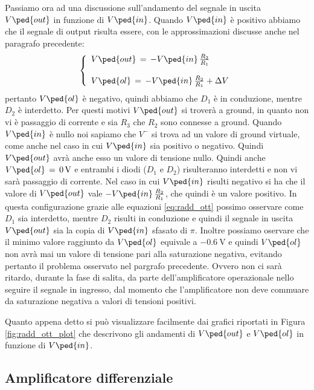 Passiamo ora ad una discussione sull'andamento del segnale in uscita $V\ped{out}$ in funzione di $V\ped{in}$. Quando $V\ped{in}$ è positivo abbiamo che il segnale di output risulta essere, con le approssimazioni discusse anche nel paragrafo precedente:
\begin{equation}
        \left\{
                \begin{array}{l l l}
                        V\ped{out}\,=\,-V\ped{in}\,\frac{R_2}{R_1}\\
                        \\
                        V\ped{ol}\,=\,-V\ped{in}\,\frac{R_2}{R_1} + \Delta V
                \end{array}
         \right.
         \label{eq:radd_ott}
\end{equation}
pertanto $V\ped{ol}$ è negativo, quindi abbiamo che $D_1$ è in conduzione, mentre $D_2$ è interdetto. Per questi motivi $V\ped{out}$ si troverà a ground, in quanto non vi è passaggio di corrente e sia $R_3$ che $R_2$ sono connesse a ground.
Quando $V\ped{in}$ è nullo noi sapiamo che $V^-$ si trova ad un valore di ground virtuale, come anche nel caso in cui $V\ped{in}$ sia positivo o negativo. Quindi $V\ped{out}$ avrà anche esso un valore di tensione nullo. Quindi anche $V\ped{ol}\,=\,\SI{0}{\volt}$ e entrambi i diodi ($D_1$ e $D_2$) risulteranno interdetti e non vi sarà passaggio di corrente.
Nel caso in cui $V\ped{in}$ risulti negativo si ha che il valore di $V\ped{out}$ vale $-V\ped{in}\,\frac{R_2}{R_1}$, che quindi è un valore positivo. In questa configurazione grazie alle equazioni \ref{eq:radd_ott} possimo osservare come $D_1$ sia interdetto, mentre $D_2$ risulti in conduzione e quindi il segnale in uscita $V\ped{out}$ sia la copia di $V\ped{in}$ sfasato di $\pi$. Inoltre possiamo oservare che il minimo valore raggiunto da $V\ped{ol}$ equivale a $\SI{-0.6}{\volt}$ e quindi $V\ped{ol}$ non avrà mai un valore di tensione pari alla saturazione negativa, evitando pertanto il problema osservato nel pargrafo precedente. Ovvero non ci sarà ritardo, durante la fase di salita, da parte dell'amplificatore operazionale nello seguire il segnale in ingresso, dal momento che l'amplificatore non deve commuare da saturazione negativa a valori di tensioni positivi.

Quanto appena detto si può visualizzare facilmente dai grafici riportati in Figura \ref{fig:radd_ott_plot} che descrivono gli andamenti di $V\ped{out}$ e $V\ped{ol}$ in funzione di $V\ped{in}$.

\subsection*{Amplificatore differenziale}

